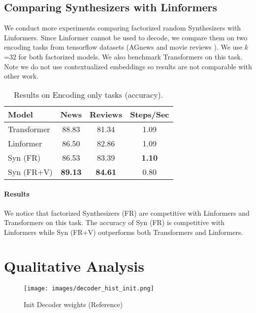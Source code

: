 \documentclass{article}
\begin{document}
\subsection{Comparing Synthesizers with Linformers}
We conduct more experiments comparing factorized random Synthesizers with Linformers. Since Linformer cannot be used to decode, we compare them on two encoding tasks from tensorflow datasets (AGnews \citep{zhang2015character} and movie reviews \citep{maas-EtAl:2011:ACL-HLT2011}). We use $k$=$32$ for both factorized models. We also benchmark Transformers on this task. Note we do not use contextualized embeddings so results are not comparable with other work. 
\begin{table}[H]
    \centering
    \begin{tabular}{l|ccc}
    \toprule
      Model   &  News & Reviews & Steps/Sec   \\
      \midrule
     Transformer    & 88.83 & 81.34 & 1.09 \\
     Linformer  & 86.50&  82.86 & 1.09\\ 
     \midrule
Syn (FR) & 86.53 & 83.39 & \textbf{1.10}\\
     Syn (FR+V) & \textbf{89.13} & \textbf{84.61} & 0.80\\ 
         \bottomrule
    \end{tabular}
    \caption{Results on Encoding only tasks (accuracy).}
    \label{tab:my_label}
\end{table}
\paragraph{Results} We notice that factorized Synthesizers (FR) are competitive with Linformers and Transformers on this task. The accuracy of Syn (FR) is competitive with Linformers while Syn (FR+V) outperforms both Transformers and Linformers.

\section{Qualitative Analysis}

\begin{figure}
 \centering
     \texttt{[image: images/decoder\_hist\_init.png]}
    \caption{Init Decoder weights (Reference)}
    \label{fig:init}
\end{figure}
\end{document}
